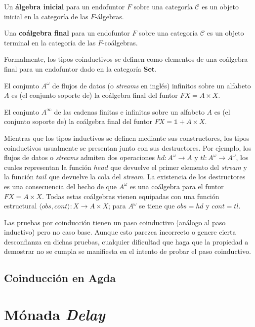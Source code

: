 \begin{definition}
Un \textbf{álgebra inicial} para un endofuntor $\mathit{F}$ sobre una categoría $\mathscr{C}$ es un objeto inicial en la categoría de las $\mathit{F}$-álgebras.
\end{definition}

\begin{definition}
Una \textbf{coálgebra final} para un endofuntor $\mathit{F}$ sobre una categoría $\mathscr{C}$ es un objeto terminal en la categoría de las $\mathit{F}$-coálgebras. 
\end{definition}

Formalmente, los tipos coinductivos se definen como elementos de una coálgebra final para un endofuntor dado en la categoría \textbf{Set}. 

\begin{ejemplo}
El conjunto $A^{\omega}$ de flujos de datos (o \textit{streams} en inglés) infinitos sobre un alfabeto $A$ es (el conjunto soporte de) la coálgebra final del funtor $\mathit{F}X = A \times X$.
\end{ejemplo}

\begin{ejemplo}
El conjunto $A^{\infty}$ de las cadenas finitas e infinitas sobre un alfabeto $A$ es (el conjunto soporte de) la coálgebra final del funtor $\mathit{F}X = \mathds{1} + A \times X$.
\end{ejemplo}

Mientras que los tipos inductivos se definen mediante sus constructores, los tipos coinductivos usualmente se presentan junto con sus destructores. Por ejemplo, los flujos de datos o \textit{streams} admiten dos operaciones $hd: A^{\omega} \rightarrow A$ y $tl : A^{\omega} \rightarrow A^{\omega}$, los cuales representan la función $head$ que devuelve el primer elemento del \textit{stream} y la función $tail$ que devuelve la cola del \textit{stream}. La existencia de los destructores es una consecuencia del hecho de que $A^{\omega}$ es una coálgebra para el funtor $\mathit{F}X = A \times X$. Todas estas coálgebras vienen equipadas con una función estructural $\langle obs, cont \rangle  : X \rightarrow A \times X$; para $A^{\omega}$ se tiene que $obs = hd$ y $cont = tl$.

Las pruebas por coinducción tienen un paso coinductivo (análogo al paso inductivo) pero no caso base. Aunque esto parezca incorrecto o genere cierta desconfianza en dichas pruebas, cualquier dificultad que haga que la propiedad a demostrar no se cumpla se manifiesta en el intento de probar el paso coinductivo.

\subsection{Coinducción en Agda}\label{coind:agda}

\section{Mónada \textit{Delay}}\label{delay:delay}